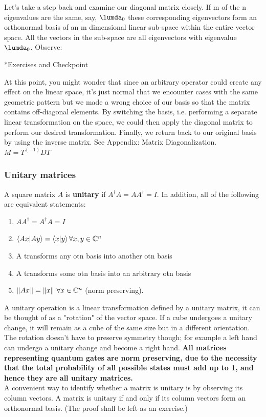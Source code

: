 \documentclass[12pt]{article}
\begin{document}
Let's take a step back and examine our diagonal matrix closely. If m of the n eigenvalues are the same, say, $\lumda_0$ these corresponding eigenvectors form an orthonormal basis of an m dimensional linear sub-space within the entire vector space. All the vectors in the sub-space are all eigenvectors with eigenvalue $\lumda_0$. Observe:

*Exercises and Checkpoint

At this point, you might wonder that since an arbitrary operator could create any effect on the linear space, it's just normal that we encounter cases with the same geometric pattern but we made a wrong choice of our basis so that the matrix contains off-diagonal elements. By switching the basis, i.e. performing a separate linear transformation on the space, we could then apply the diagonal matrix to perform our desired transformation. Finally, we return back to our original basis by using the inverse matrix. See Appendix: Matrix Diagonalization.
$M = T^(-1)DT$

\subsubsection{Unitary matrices}
A square matrix $A$ is \textbf{unitary} if $A^\dag A=AA^\dag=I$. In addition, all of the following are equivalent statements:
\begin{enumerate}
    \item $AA^\dag=A^\dag A=I$
    \item $\braket{Ax}{Ay}=\braket{x}{y} \forall x,y\in \mathbb{C}^n$
    \item A transforms any otn basis into another otn basis
    \item A transforms some otn basis into an arbitrary otn basis
    \item $\norm{Ax}=\norm{x}\  \forall x\in \mathbb{C}^n$ (norm preserving).
\end{enumerate}
A unitary operation is a linear transformation defined by a unitary matrix, it can be thought of as a "rotation" of the vector space. If a cube undergoes a unitary change, it will remain as a cube of the same size but in a different orientation. The rotation doesn't have to preserve symmetry though; for example a left hand can undergo a unitary change and become a right hand. \textbf{All matrices representing quantum gates are norm preserving, due to the necessity that the total probability of all possible states must add up to 1, and hence they are all unitary matrices.}\\ 
A convenient way to identify whether a matrix is unitary is by observing its column vectors. A matrix is unitary if and only if its column vectors form an orthonormal basis. (The proof shall be left as an exercise.)
\end{document}
